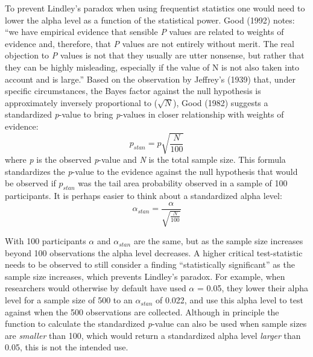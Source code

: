 \documentclass[,jou,floatsintext]{apa6}
\begin{document}
To prevent Lindley's paradox when using frequentist statistics one would need to lower the alpha level as a function of the statistical power. Good (1992) notes: \enquote{we have empirical evidence that sensible \emph{P} values are related to weights of evidence and, therefore, that \emph{P} values are not entirely without merit. The real objection to \emph{P} values is not that they usually are utter nonsense, but rather that they can be highly misleading, especially if the value of N is not also taken into account and is large.} Based on the observation by Jeffrey's (1939) that, under specific circumstances, the Bayes factor against the null hypothesis is approximately inversely proportional to (\(\sqrt{N}\)), Good (1982) suggests a standardized \emph{p}-value to bring \emph{p}-values in closer relationship with weights of evidence:
\begin{equation}
p_{stan} = p\sqrt{\frac{N}{100}} 
\label{eq:pstan}
\end{equation}
where \emph{p} is the observed \emph{p}-value and \emph{N} is the total sample size. This formula standardizes the \emph{p}-value to the evidence against the null hypothesis that would be observed if \(p_{stan}\) was the tail area probability observed in a sample of 100 participants. It is perhaps easier to think about a standardized alpha level:
\begin{equation}
\alpha_{stan} = \frac{\alpha}{\sqrt{\frac{N}{100}}} \label{eq:astan}
\end{equation}

With 100 participants \(\alpha\) and \(\alpha_{stan}\) are the same, but as the sample size increases beyond 100 observations the alpha level decreases. A higher critical test-statistic needs to be observed to still consider a finding \enquote{statistically significant} as the sample size increases, which prevents Lindley's paradox. For example, when researchers would otherwise by default have used \(\alpha\) = 0.05, they lower their alpha level for a sample size of 500 to an \(\alpha_{stan}\) of 0.022, and use this alpha level to test against when the 500 observations are collected. Although in principle the function to calculate the standardized \emph{p}-value can also be used when sample sizes are \emph{smaller} than 100, which would return a standardized alpha level \emph{larger} than 0.05, this is not the intended use.
\end{document}
